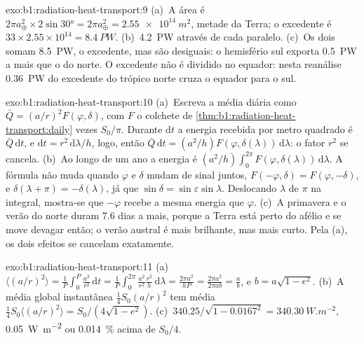 \begin{solution}{exo:b1:radiation-heat-transport:9}
(a)~A área é $2\pi a_\oplus^2 \times 2\sin\ang{30} = 2\pi a_\oplus^2 =
\qty{2.55e14}{m^2}$, metade da Terra; o excedente é $33 \times 2.55\times10^{14} =
\qty{8.4}{PW}$. (b)~\qty{4.2}{PW} através de cada paralelo. (c)~Os dois somam \qty{8.5}{PW}, o
excedente, mas são desiguais: o hemisfério sul exporta \qty{0.5}{PW} a mais que o do norte. O
excedente não é dividido no equador: nesta reanálise \qty{0.36}{PW} do excedente do trópico norte
cruza o equador para o sul.
\end{solution}

\begin{solution}{exo:b1:radiation-heat-transport:10}
(a)~Escreva a média diária como $\bar Q = (a/r)^2 F(\varphi, \delta)$, com $F$ o colchete de
\cref{thm:b1:radiation-heat-transport:daily} vezes $S_0/\pi$. Durante $\mathrm dt$ a energia
recebida por metro quadrado é $\bar Q\,\mathrm dt$, e $\mathrm dt = r^2\,\mathrm d\lambda/h$, logo, então
$\bar Q\,\mathrm dt = (a^2/h)
F(\varphi, \delta(\lambda))\,\mathrm d\lambda$: o fator $r^2$ se cancela. (b)~Ao longo de um ano a
energia é $(a^2/h)\int_0^{2\pi} F(\varphi,
\delta(\lambda))\,\mathrm d\lambda$. A fórmula não muda quando $\varphi$ e $\delta$ mudam de sinal
juntos, $F(-\varphi, \delta) = F(\varphi, -\delta)$, e $\delta(\lambda + \pi) = -\delta(\lambda)$, já
que $\sin\delta = \sin\varepsilon
\sin\lambda$. Deslocando $\lambda$ de $\pi$ na integral, mostra-se que $-\varphi$ recebe a mesma
energia que $\varphi$. (c)~A primavera e o verão do norte duram \num{7.6} dias a mais, porque a Terra
está perto do afélio e se move devagar então; o verão austral é mais brilhante, mas mais curto. Pela
(a), os dois efeitos se cancelam exatamente.
\end{solution}

\begin{solution}{exo:b1:radiation-heat-transport:11}
(a)~$\langle (a/r)^2\rangle = \frac1P\int_0^P \frac{a^2}{r^2}\,\mathrm dt =
\frac1P\int_0^{2\pi}\frac{a^2}{r^2}\frac{r^2}{h}\,\mathrm d\lambda = \frac{2\pi
a^2}{hP} = \frac{2\pi a^2}{2\pi a b} = \frac ab$, e $b = a\sqrt{1-e^2}$.
(b)~A média global instantânea $\frac14 S_0(a/r)^2$ tem média $\frac14 S_0
\langle(a/r)^2\rangle = S_0/(4\sqrt{1-e^2})$. (c)~$340.25/\sqrt{1 - 0.0167^2} =
\qty{340.30}{W.m^{-2}}$, \qty{0.05}{W.m^{-2}} ou \qty{0.014}{\percent} acima de $S_0/4$.
\end{solution}

